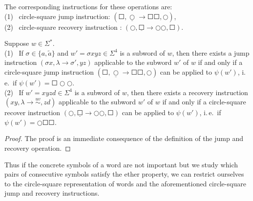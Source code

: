 The corresponding instructions for these operations are:\\
\indent \indent (1) \ circle-square jump instruction: $(\Square, \underline{\Circle} \to \Square \Square, \Circle)$,\\
\indent \indent (2) \ circle-square recovery instruction : $(\Circle, \underline{\Square} \to \Circle \Circle, \Square)$.

\begin{lemma}\label{lemma:circle-square-jump-and-recover}
Suppose $w \in \Sigma^*$.\\
\indent (1) \ If $\sigma \in \{a, \tilde{a}\}$ and $w' = \sigma x y z \in \Sigma^4$ is a subword of $w$, then there exists a jump instruction $(\sigma x, \lambda \to \sigma', yz)$ applicable to the subword $w'$ of $w$ if and only if a circle-square jump instruction $(\Square, \underline{\Circle} \to \Square \Square, \Circle)$ can be applied to $\psi(w')$, i.\,e.\ if $\psi(w') = \Square \Circle \Circle$.\\
\indent (2) \ If $w' = x y z d \in \Sigma^4$ is a subword of $w$, then there exists a recovery instruction $(xy, \lambda \to \stackrel{uv}{\sim}, zd)$ applicable to the subword $w'$ of $w$ if and only if a circle-square recover instruction $(\Circle, \underline{\Square} \to \Circle \Circle, \Square)$ can be applied to $\psi(w')$, i.\,e.\ if $\psi(w') = \Circle \Square \Square$.
\end{lemma}

\begin{proof}
The proof is an immediate consequence of the definition of the jump and recovery operation.
\end{proof}

Thus if the concrete symbols of a word are not important but we study which pairs of consecutive symbols satisfy the ether property, we can restrict ourselves to the circle-square representation of words and
the aforementioned circle-square jump and recovery instructions.

